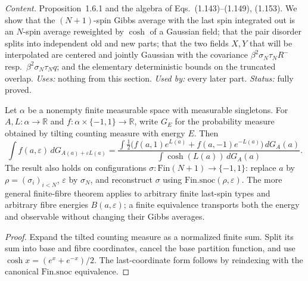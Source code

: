 \emph{Content.} Proposition~1.6.1 and the algebra of Eqs.~(1.143)--(1.149), (1.153).  We show
that the $(N+1)$-spin Gibbs average with the last spin integrated out is an $N$-spin average
reweighted by $\cosh$ of a Gaussian field; that the pair disorder splits into independent
old and new parts; that the two fields $X,Y$ that will be interpolated are centered and jointly
Gaussian with the covariance $\beta^2\sigma_N\tau_N R^-$ resp.\ $\beta^2\sigma_N\tau_N q$; and the
elementary deterministic bounds on the truncated overlap.  \emph{Uses:} nothing from this section.
\emph{Used by:} every later part.  \emph{Status:} fully proved.

\begin{theorem}
\label{thm:sg-tal:cavity-finite}
  \leanok
{}
Let $\alpha$ be a nonempty finite measurable space with measurable singletons.
For $A,L:\alpha\to\mathbb R$ and $f:\alpha\times\{-1,1\}\to\mathbb R$,
write $G_E$ for the probability measure obtained by tilting counting measure
with energy $E$. Then
\[
\int f(a,\varepsilon)\,dG_{A(a)+\varepsilon L(a)}
=\frac{\int \frac12\bigl(f(a,1)e^{L(a)}+f(a,-1)e^{-L(a)}\bigr)\,dG_A(a)}
{\int\cosh(L(a))\,dG_A(a)}.
\]
The result also holds on configurations $\sigma:\mathrm{Fin}(N+1)\to\{-1,1\}$:
replace $a$ by $\rho=(\sigma_i)_{i<N}$, $\varepsilon$ by $\sigma_N$,
and reconstruct $\sigma$ using $\mathrm{Fin.snoc}(\rho,\varepsilon)$.
The more general finite-fibre theorem applies to arbitrary finite last-spin types
and arbitrary fibre energies $B(a,\varepsilon)$; a finite equivalence transports
both the energy and observable without changing their Gibbs averages.
\end{theorem}
\begin{proof}
  \leanok
Expand the tilted counting measure as a normalized finite sum. Split its sum
into base and fibre coordinates, cancel the base partition function, and use
$\cosh x=(e^x+e^{-x})/2$. The last-coordinate form follows by reindexing
with the canonical $\mathrm{Fin.snoc}$ equivalence.
\end{proof}

